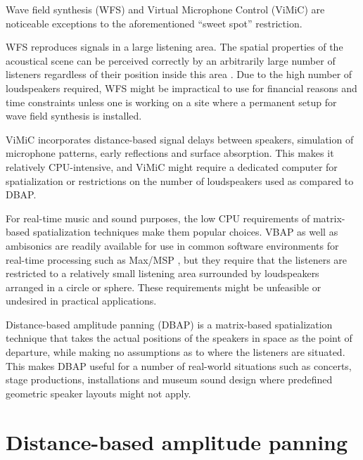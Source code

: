 \documentclass[twoside,10pt]{article}
\begin{document}
Wave field synthesis (WFS) and Virtual Microphone Control (ViMiC) \cite{Peters:2008vimic} are noticeable exceptions to the aforementioned ``sweet spot'' restriction.

WFS reproduces signals in a large listening area. The spatial properties of the acoustical scene can be perceived correctly by an arbitrarily large number of listeners regardless of their position inside this area \cite{Spors:2004sound_field_synthesis}. Due to the high number of loudspeakers required, WFS might be impractical to use for financial reasons and time constraints unless one is working on a site where a permanent setup for wave field synthesis is installed.

ViMiC incorporates distance-based signal delays between speakers, simulation of microphone patterns, early reflections and surface absorption. This makes it relatively CPU-intensive, and ViMiC might require a dedicated computer for spatialization or restrictions on the number of loudspeakers used as compared to DBAP.

For real-time music and sound purposes, the low CPU requirements of matrix-based spatialization techniques make them popular choices. VBAP as well as ambisonics are readily available for use in common software environments for real-time processing such as Max/MSP \cite{Pulkki:2000vbap_max, Schacher:2006ambi_max, Neukom:2008ambipan}, but they require that the listeners are restricted to a relatively small listening area surrounded by loudspeakers arranged in a circle or sphere.  These requirements might be unfeasible or undesired in practical applications.  

Distance-based amplitude panning (DBAP) is a matrix-based spatialization technique that takes the actual positions of the speakers in space as the point of departure, while making no assumptions as to where the listeners are situated. This makes DBAP useful for a number of real-world situations such as concerts, stage productions, installations\cite{lossius:2008installations} and museum sound design where predefined geometric speaker layouts might not apply.


%
%

\section{Distance-based amplitude panning}
\end{document}
